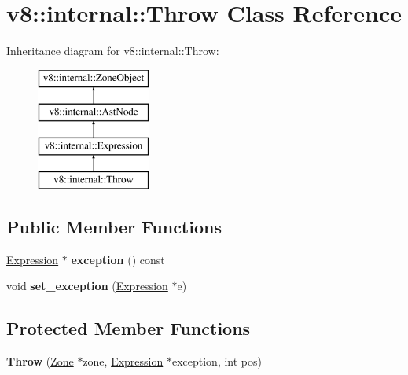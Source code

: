 \hypertarget{classv8_1_1internal_1_1_throw}{}\section{v8\+:\+:internal\+:\+:Throw Class Reference}
\label{classv8_1_1internal_1_1_throw}
Inheritance diagram for v8\+:\+:internal\+:\+:Throw\+:\begin{figure}[H]
\begin{center}
\leavevmode
\includegraphics[height=4.000000cm]{classv8_1_1internal_1_1_throw}
\end{center}
\end{figure}
\subsection*{Public Member Functions}
\begin{DoxyCompactItemize}
\item 
\hyperlink{classv8_1_1internal_1_1_expression}{Expression} $\ast$ {\bfseries exception} () const \hypertarget{classv8_1_1internal_1_1_throw_a687bb00c79ab03ef7b0c557749cb8bc7}{}\label{classv8_1_1internal_1_1_throw_a687bb00c79ab03ef7b0c557749cb8bc7}

\item 
void {\bfseries set\+\_\+exception} (\hyperlink{classv8_1_1internal_1_1_expression}{Expression} $\ast$e)\hypertarget{classv8_1_1internal_1_1_throw_a1faa6aff3b46e92b94efe47029143384}{}\label{classv8_1_1internal_1_1_throw_a1faa6aff3b46e92b94efe47029143384}

\end{DoxyCompactItemize}
\subsection*{Protected Member Functions}
\begin{DoxyCompactItemize}
\item 
{\bfseries Throw} (\hyperlink{classv8_1_1internal_1_1_zone}{Zone} $\ast$zone, \hyperlink{classv8_1_1internal_1_1_expression}{Expression} $\ast$exception, int pos)\hypertarget{classv8_1_1internal_1_1_throw_afdd841ef33a27e2324ad72066dbb47c8}{}\label{classv8_1_1internal_1_1_throw_afdd841ef33a27e2324ad72066dbb47c8}

\end{DoxyCompactItemize}
